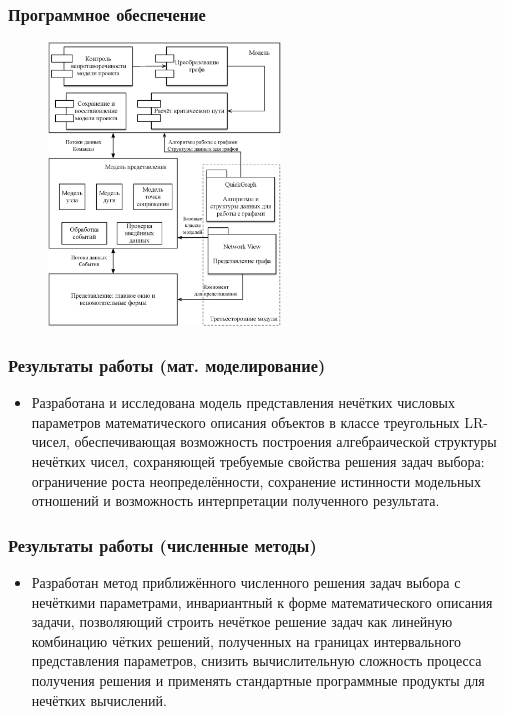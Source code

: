 \documentclass[12pt]{beamer}
\begin{document}

\begin{frame}
  \frametitle{Программное обеспечение}
  \begin{figure}
    \center
    \includegraphics[width=0.55\textwidth]{app-architecture}
  \end{figure}
\end{frame}


\begin{frame}
  \frametitle{Результаты работы (мат. моделирование)}
  \begin{itemize}
  \item Разработана и исследована модель представления нечётких числовых параметров математического описания объектов в классе треугольных LR-чисел, обеспечивающая возможность построения алгебраической структуры нечётких чисел, сохраняющей требуемые свойства решения задач выбора: ограничение роста неопределённости, сохранение истинности модельных отношений и возможность интерпретации полученного результата.
  \end{itemize}
\end{frame}


\begin{frame}
  \frametitle{Результаты работы (численные методы)}
  \begin{itemize}
    \item Разработан метод приближённого численного решения задач выбора с нечёткими параметрами, инвариантный к форме математического описания задачи, позволяющий строить нечёткое решение задач как линейную комбинацию чётких решений, полученных на границах интервального представления параметров, снизить вычислительную сложность процесса получения решения и применять стандартные программные продукты для нечётких вычислений.
  \end{itemize}
\end{frame}
\end{document}
